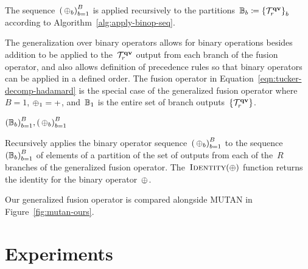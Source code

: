 \begin{itemize}
                The sequence~$\binopseq$ is applied recursively to the
                partitions~$\mathbb{B}_b \coloneqq {\{\ensuremath{\mathcal{T}_r^{\mathbf{q}{}\mathbf{v}{}}}\}}_b$ according
                to Algorithm~\ref{alg:apply-binop-seq}.

                The generalization over binary operators allows for binary
                operations besides addition to be applied to the~$\mathcal{T}_r^{\mathbf{q}{}\mathbf{v}{}}$
                output from each branch of the fusion operator, and also allows
                definition of precedence rules so that binary operators can be
                applied in a defined order. The fusion operator in
                Equation~\ref{eqn:tucker-decomp-hadamard} is the special case
                of the generalized fusion operator where~$B = 1$,
                $\operatorname*{\oplus}_1 = +$, and~$\mathbb{B}_1$ is the entire set of branch
                outputs~$\{\mathcal{T}_r^{\mathbf{q}{}\mathbf{v}{}}\}$.
\end{itemize}

\begin{algorithm}
\begin{algorithmic}[1]
                 {$\binoppartBseq, \binopseq$}
                        \EndFor{}
                \EndFor{}
        \EndFunction{}
\caption{Recursively applies the binary operator sequence~$\binopseq$ to the
        sequence~${(\mathbb{B}_b)}_{b = 1}^B$ of elements of a partition of the set of
        outputs from each of the~$R$ branches of the generalized fusion
        operator. The~$\textproc{Identity}{(\binop)}$ function returns the
        identity for the binary operator~$\operatorname*{\oplus}$.}
\label{alg:apply-binop-seq}
\end{algorithmic}
\end{algorithm}


Our generalized fusion operator is compared alongside MUTAN in
Figure~\ref{fig:mutan-ours}.


\section{Experiments}
\label{sec:experiments}

